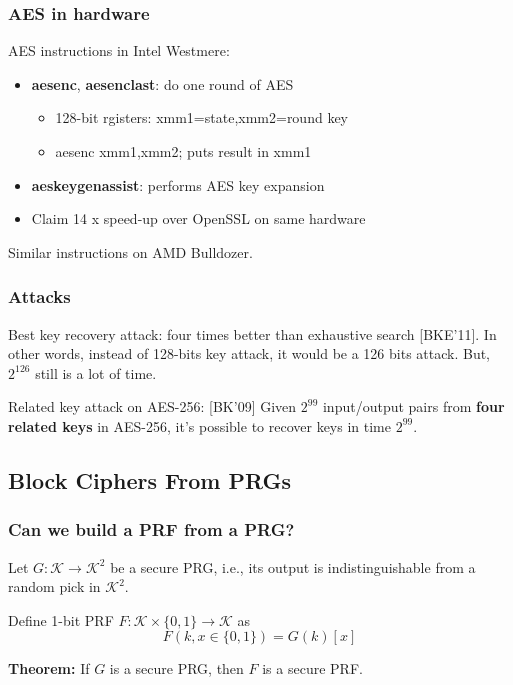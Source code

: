 \documentclass[12pt]{book}
\newcommand{\Thm}{\textbf{Theorem:} }
\begin{document}
\subsubsection{AES in hardware}
AES instructions in Intel Westmere:
\begin{itemize}
	\item \textbf{aesenc}, \textbf{aesenclast}: do one round of AES
	\begin{itemize}
		\item[] 128-bit rgisters: xmm1=state,xmm2=round key
		\item[] aesenc xmm1,xmm2; puts result in xmm1
	\end{itemize}
	\item \textbf{aeskeygenassist}: performs AES key expansion
	\item Claim 14 x speed-up over OpenSSL on same hardware
\end{itemize}
Similar instructions on AMD Bulldozer.

\subsubsection{Attacks}
Best key recovery attack: four times better than exhaustive search [BKE'11]. In other words, instead of 128-bits key attack, it would be a 126 bits attack. But, $2^{126}$ still is a lot of time.

Related key attack on AES-256: [BK'09] Given $2^{99}$ input/output pairs from \textbf{four related keys} in AES-256, it's possible to recover keys in time $2^{99}$.

\subsection{Block Ciphers From PRGs}
\subsubsection{Can we build a PRF from a PRG?}
Let $G:\mathcal{K}\rightarrow\mathcal{K}^{2}$ be a secure PRG, i.e., its output is indistinguishable from a random pick in $\mathcal{K}^{2}$.

Define 1-bit PRF $F:\mathcal{K}\times\{0,1\}\rightarrow\mathcal{K}$ as
$$F(k,x\in\{0,1\})=G(k)[x]$$
\begin{center}
\end{center}
\Thm If $G$ is a secure PRG, then $F$ is a secure PRF.
\end{document}
